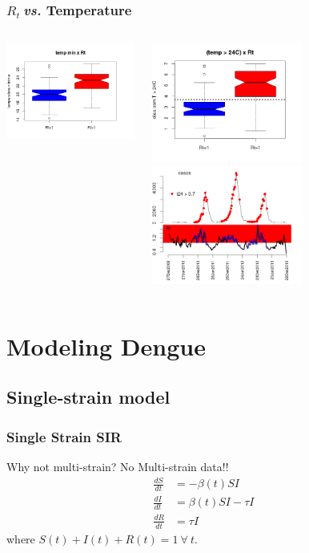 \documentclass[10pt,compress,notheorems]{beamer}
\def \rr {$R_{t}\:$}
\begin{document}
\begin{frame}
\frametitle{\rr \emph{vs.} Temperature}
\begin{columns}
 \column{5cm}
\includegraphics[width=5cm]{./rt_min_t.png}

\includegraphics[width=5cm]{./rt_t24.png}
 \column{6cm}
\includegraphics[width=5cm]{./transmissao_temp.png}
\end{columns}
\end{frame}

\section{Modeling Dengue}
\subsection{Single-strain model}
\begin{frame}
\frametitle{Single Strain SIR}
Why not multi-strain? No Multi-strain data!!
\begin{align}
   \label{eq:model}
 \frac{dS}{dt} &= -\beta(t)SI \\     \nonumber
 \frac{dI}{dt} &= \beta(t)SI - \tau I&\\      \nonumber
 \frac{dR}{dt} &= \tau I&
\end{align}  
where $S(t) + I(t) + R(t) = 1 \: \forall\: t$. %


\end{frame}
\end{document}
